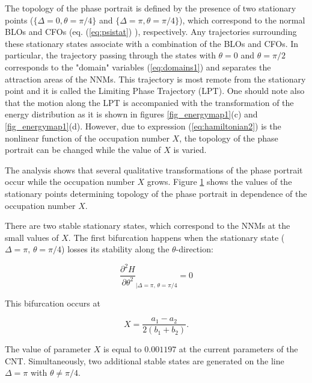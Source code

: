 The topology of the phase portrait is defined by the presence of two stationary points ($\{\Delta =0, \theta=\pi/4\}$ and $\{\Delta=\pi, \theta=\pi/4\}$), which correspond to the
normal BLOs and CFOs (eq. (\ref{eq:psistat}) ), respectively.
Any trajectories surrounding these stationary states associate with a combination of the BLOs and CFOs.
In particular, the trajectory passing through the states with $\theta=0$ and $\theta=\pi/2$ corresponds to the "domain" variables (\ref{eq:domains1}) and separates the attraction areas of the NNMs.
This trajectory is most remote from the stationary point and it is called the Limiting Phase Trajectory (LPT).
One should note also that the motion along the LPT is accompanied with the transformation of the energy distribution as it is shown in figures \ref{fig_energymap1}(c) and \ref{fig_energymap1}(d).
However, due to  expression (\ref{eq:hamiltonian2}) is the nonlinear function of the occupation number $X$, the topology of the phase portrait can be changed while the value of $X$ is varied.

The analysis shows that several qualitative transformations of the phase portrait occur while the occupation number $X$ grows.
Figure \ref{fig:TDvsX} shows the values of the stationary points determining topology of the phase portrait in dependence of the occupation number $X$.

There are two stable stationary states, which correspond to the NNMs at the small values of $X$.
The first bifurcation happens when the stationary state ($\Delta = \pi, \, \theta = \pi/4$) losses its stability along the $\theta$-direction:

\begin{equation}
\frac{\partial^{2} H}{\partial \theta ^{2}}_{|\Delta=\pi,\, \theta=\pi/4} = 0 
\end{equation}

This bifurcation occurs at

\begin{equation}\label{eq:X1}
X=\frac{a_{1}-a_{2}}{2(b_{1}+b_{2})}.
\end{equation}

The value of parameter $X$ is equal to $0.001197$ at the current parameters of the CNT.
Simultaneously, two additional stable states are generated on the line $\Delta=\pi$ with $ \theta \ne \pi/4$. 

\begin{figure}
\label{fig:TDvsX}
\end{figure}

